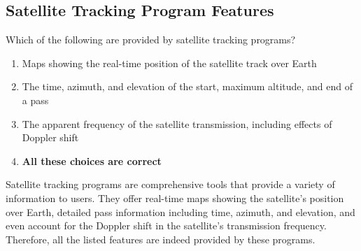 \subsection{Satellite Tracking Program Features}
\label{T8B03}

\begin{tcolorbox}[colback=gray!10!white,colframe=black!75!black,title=T8B03]
Which of the following are provided by satellite tracking programs?
\begin{enumerate}[noitemsep]
    \item Maps showing the real-time position of the satellite track over Earth
    \item The time, azimuth, and elevation of the start, maximum altitude, and end of a pass
    \item The apparent frequency of the satellite transmission, including effects of Doppler shift
    \item \textbf{All these choices are correct}
\end{enumerate}
\end{tcolorbox}

Satellite tracking programs are comprehensive tools that provide a variety of information to users. They offer real-time maps showing the satellite's position over Earth, detailed pass information including time, azimuth, and elevation, and even account for the Doppler shift in the satellite's transmission frequency. Therefore, all the listed features are indeed provided by these programs.